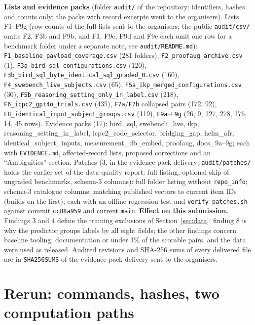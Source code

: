\documentclass{article}
\begin{document}
{\raggedright\textbf{Lists and evidence packs} (folder \texttt{audit/} of the repository: identifiers, hashes and counts only; the
packs with record excerpts went to the organisers). Lists F1--F9g (row counts of the full lists sent to the organisers; the public \texttt{audit/csv/} omits F2, F3b and F9b, and F1, F9c, F9d and F9e each omit one row for a benchmark folder under a separate note, see \texttt{audit/README.md}): \texttt{F1\_baseline\_payload\_coverage.csv} (281
folders), \texttt{F2\_proofaug\_archive.csv} (1), \texttt{F3a\_bird\_sql\_configurations.csv} (120),
\texttt{F3b\_bird\_sql\_byte\_identical\_sql\_graded\_0.csv} (160), \texttt{F4\_swebench\_live\_subjects.csv} (65),
\texttt{F5a\_ikp\_merged\_configurations.csv} (30), \texttt{F5b\_reasoning\_setting\_only\_in\_label.csv} (218),
\texttt{F6\_icpc2\_gpt4o\_trials.csv} (435), \texttt{F7a}/\texttt{F7b} collapsed pairs (172, 92),
\texttt{F8\_identical\_input\_subject\_groups.csv} (119), \texttt{F9a}--\texttt{F9g} (26, 9, 127, 278, 176, 14, 45 rows).
Evidence packs (17): bird\_sql, swebench\_live, ikp, reasoning\_setting\_in\_label, icpc2\_code\_selector, bridging\_gap,
helm\_afr, identical\_subject\_inputs, measurement\_db\_embed, proofaug, docs\_9a--9g; each with \texttt{EVIDENCE.md},
affected-record lists, proposed corrections and an ``Ambiguities'' section. Patches (3, in the evidence-pack delivery; \texttt{audit/patches/} holds the earlier set of the data-quality report: full listing, optional skip of ungraded benchmarks, schema-3 columns): full folder listing without
\texttt{repo\_info}; schema-3 catalogue columns; matching published vectors to current item IDs (builds on the first);
each with an offline regression test and \texttt{verify\_patches.sh} against commit \texttt{cc88a959} and current
\texttt{main}. \textbf{Effect on this submission.} Findings 3 and 4 define the training exclusions of
Section~\ref{sec:data}; finding 8 is why the predictor groups labels by all eight fields; the other findings concern
baseline tooling, documentation or under 1\% of the scorable pairs, and the data were used as released. Audited
revisions and SHA-256 sums of every delivered file are in \texttt{SHA256SUMS} of the evidence-pack delivery sent to the organisers.\par}

\FloatBarrier
\section{Rerun: commands, hashes, two computation paths}
\label{app:rerun}
\end{document}
